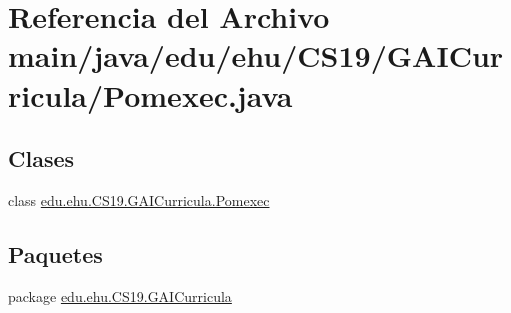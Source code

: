 \hypertarget{a00005}{}\section{Referencia del Archivo main/java/edu/ehu/\+C\+S19/\+G\+A\+I\+Curricula/\+Pomexec.java}
\label{a00005}
\subsection*{Clases}
\begin{DoxyCompactItemize}
\item 
class \mbox{\hyperlink{a00029}{edu.\+ehu.\+C\+S19.\+G\+A\+I\+Curricula.\+Pomexec}}
\end{DoxyCompactItemize}
\subsection*{Paquetes}
\begin{DoxyCompactItemize}
\item 
package \mbox{\hyperlink{a00017}{edu.\+ehu.\+C\+S19.\+G\+A\+I\+Curricula}}
\end{DoxyCompactItemize}

